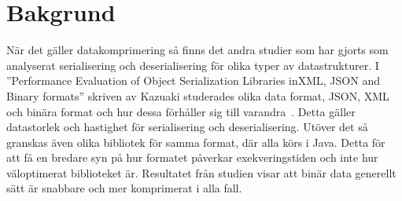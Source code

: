 \section{Bakgrund}
\label{sec:tim-background}
När det gäller datakomprimering så finns det andra studier som har gjorts som analyserat serialisering och deserialisering för olika typer av datastrukturer. I ''Performance Evaluation of Object Serialization Libraries inXML, JSON and Binary formats'' skriven av Kazuaki studerades olika data format, JSON, XML och binära format och hur dessa förhåller sig till varandra~\cite{serialization}. Detta gäller datastorlek och hastighet för serialisering och deserialisering. Utöver det så granskas även olika bibliotek för samma format, där alla körs i Java. Detta för att få en bredare syn på hur formatet påverkar exekveringstiden och inte hur väloptimerat biblioteket är. Resultatet från studien visar att binär data generellt sätt är snabbare och mer komprimerat i alla fall.

